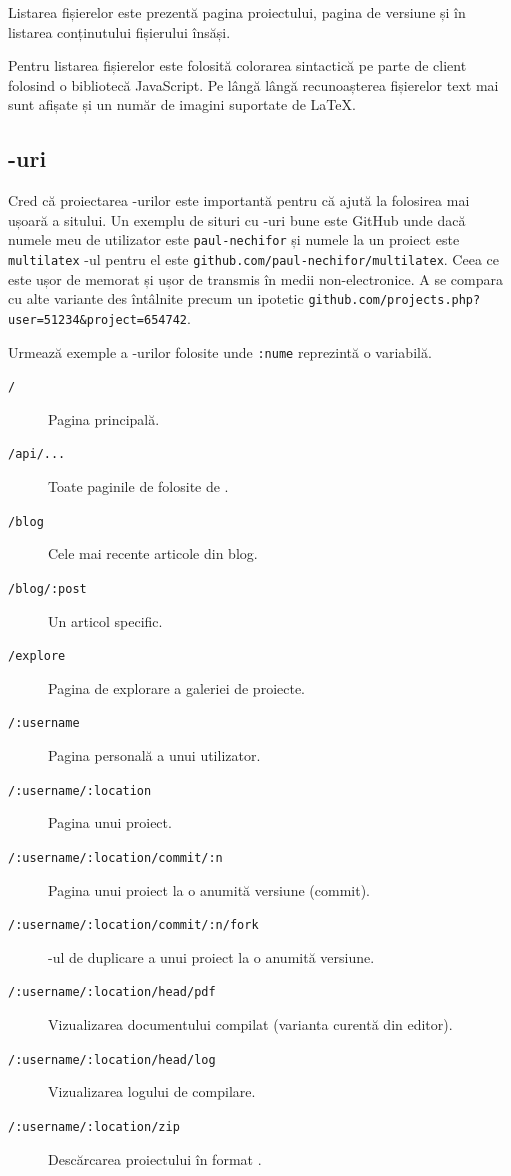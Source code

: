 \documentclass[a4wide,12pt]{report}
\newcommand{\eng}[1]{{#1}} %
\newcommand{\cod}[1]{\texttt{#1}}
\newcommand{\acr}[1]{{\textsmaller[1]{\textsc{#1}}}} %
\begin{document}
Listarea fișierelor este prezentă pagina proiectului, pagina de versiune și
în listarea conținutului fișierului însăși.

Pentru listarea fișierelor este folosită colorarea sintactică pe parte de client
folosind o bibliotecă JavaScript. Pe lângă lângă recunoașterea fișierelor text mai
sunt afișate și un număr de imagini suportate de \LaTeX{}.

\subsection{\acr{URL}-uri}

Cred că proiectarea \acr{URL}-urilor este importantă pentru că ajută la
folosirea mai ușoară a sitului. Un exemplu de situri cu \acr{URL}-uri bune este
GitHub unde dacă numele meu de utilizator este \cod{paul-nechifor} și numele la
un proiect este \cod{multilatex} \acr{URL}-ul pentru el este
\cod{github.com/paul-nechifor/multilatex}. Ceea ce este ușor de memorat și ușor
de transmis în medii non-electronice. A se compara cu alte variante des
întâlnite precum un ipotetic
\cod{github.com/projects.php?user=51234\&project=654742}.

Urmează exemple a \acr{URL}-urilor folosite unde \cod{:nume} reprezintă o
variabilă.

\begin{description}

\item[\cod{/}] Pagina principală.

\item[\cod{/api/...}] Toate paginile de folosite de \acr{API}.

\item[\cod{/blog}] Cele mai recente articole din blog.

\item[\cod{/blog/:post}] Un articol specific.

\item[\cod{/explore}] Pagina de explorare a galeriei de proiecte.

\item[\cod{/:username}] Pagina personală a unui utilizator.

\item[\cod{/:username/:location}] Pagina unui proiect.

\item[\cod{/:username/:location/commit/:n}] Pagina unui proiect la o anumită
versiune (\eng{commit}).

\item[\cod{/:username/:location/commit/:n/fork}] \acr{URL}-ul de duplicare a
unui proiect la o anumită versiune.

\item[\cod{/:username/:location/head/pdf}] Vizualizarea documentului compilat
(varianta curentă din editor).

\item[\cod{/:username/:location/head/log}] Vizualizarea logului de compilare.

\item[\cod{/:username/:location/zip}] Descărcarea proiectului în format \acr{ZIP}.

\end{description}
\end{document}
